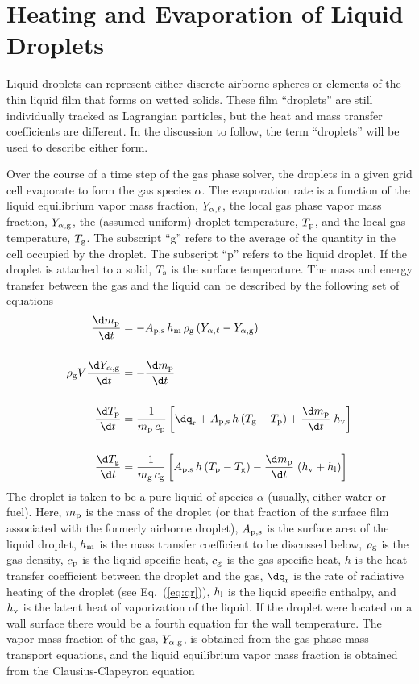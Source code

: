 \section{Heating and Evaporation of Liquid Droplets}

Liquid droplets can represent either discrete airborne spheres or elements of the thin liquid film that forms on wetted solids. These film ``droplets'' are still individually tracked as Lagrangian particles, but the heat and mass transfer coefficients are different. In the discussion to follow, the term ``droplets'' will be used to describe either form.

Over the course of a time step of the gas phase solver, the droplets in a given grid cell evaporate to form the gas species $\alpha$. The evaporation rate is a function of the liquid equilibrium vapor mass fraction, $Y_{\rm \alpha,\ell}$, the local gas phase vapor mass fraction, $Y_{\rm \alpha,g}$, the (assumed uniform) droplet temperature, $T_{\rm p}$, and the local gas temperature, $T_{\rm g}$. The subscript ``g'' refers to the average of the quantity in the cell occupied by the droplet. The subscript ``p'' refers to the liquid droplet. If the droplet is attached to a solid, $T_{\rm s}$ is the surface temperature. The mass and energy transfer between the gas and the liquid can be described by the following set of equations~\cite{Cheremisinoff:1}
\begin{align}
\frac{\d m_{\rm p}}{\d t} & = - A_{\rm p,s} \, h_{\rm m} \, \rho_{\rm g} \, (Y_{\alpha,\ell} - Y_{\rm \alpha, g}) \label{droplet_mass} \\[0.2in]
\rho_{\rm g} V \frac{\d Y_{\rm \alpha, g}}{\d t} & = -\frac{\d m_{\rm p}}{\d t}  \label{droplet_gas_fraction} \\[0.2in]
\frac{\d T_{\rm p}}{\d t} & = \frac{1}{m_{\rm p} \, c_{\rm p}}  \left[ \dq_{\rm r} + A_{\rm p,s} \, h  \, (T_{\rm g}-T_{\rm p}) + \frac{\d m_{\rm p}}{\d t} \; h_{\rm v} \right]  \label{droplet_temp}  \\[0.2in]
\frac{\d T_{\rm g}}{\d t} & = \frac{1}{m_{\rm g} \, c_{\rm g}}  \left[A_{\rm p,s} \, h  \, (T_{\rm p}-T_{\rm g}) - \frac{\d m_{\rm p}}{\d t} \; (h_{\rm v}+h_{\rm l}) \right]  \label{droplet_gas_temp}
\end{align}
The droplet is taken to be a pure liquid of species $\alpha$ (usually, either water or fuel).  Here, $m_{\rm p}$ is the mass of the droplet (or that fraction of the surface film associated with the formerly airborne droplet), $A_{\rm p,s}$ is the surface area of the liquid droplet, $h_{\rm m}$ is the mass transfer coefficient to be discussed below, $\rho_{\rm g}$ is the gas density, $c_{\rm p}$ is the liquid specific heat, $c_{\rm g}$ is the gas specific heat, $h$ is the heat transfer coefficient between the droplet and the gas, $\dq_{\rm r}$ is the rate of radiative heating of the droplet (see Eq.~(\ref{eq:qr})), $h_{\rm l}$ is the liquid specific enthalpy, and $h_{\rm v}$ is the latent heat of vaporization of the liquid. If the droplet were located on a wall surface there would be a fourth equation for the wall temperature. The vapor mass fraction of the gas, $Y_{\rm \alpha,g}$, is obtained from the gas phase mass transport equations, and the liquid equilibrium vapor mass fraction is obtained from the Clausius-Clapeyron equation
